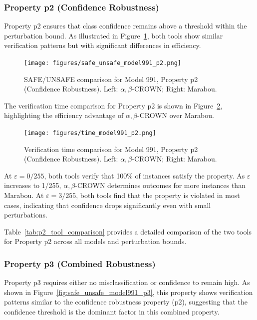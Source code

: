 

\subsubsection{Property p2 (Confidence Robustness)}

Property p2 ensures that class confidence remains above a threshold within the perturbation bound. As illustrated in Figure~\ref{fig:safe_unsafe_model991_p2}, both tools show similar verification patterns but with significant differences in efficiency.

\begin{figure}[htbp]
    \centering
    \texttt{[image: figures/safe\_unsafe\_model991\_p2.png]}
    \caption{SAFE/UNSAFE comparison for Model 991, Property p2 (Confidence Robustness). Left: $\alpha, \beta$-CROWN; Right: Marabou.}
    \label{fig:safe_unsafe_model991_p2}
\end{figure}

The verification time comparison for Property p2 is shown in Figure~\ref{fig:time_model991_p2}, highlighting the efficiency advantage of $\alpha, \beta$-CROWN over Marabou.

\begin{figure}[htbp]
    \centering
    \texttt{[image: figures/time\_model991\_p2.png]}
    \caption{Verification time comparison for Model 991, Property p2 (Confidence Robustness). Left: $\alpha, \beta$-CROWN; Right: Marabou.}
    \label{fig:time_model991_p2}
\end{figure}

At $\varepsilon = 0/255$, both tools verify that 100\% of instances satisfy the property. As $\varepsilon$ increases to 1/255, $\alpha, \beta$-CROWN determines outcomes for more instances than Marabou. At $\varepsilon = 3/255$, both tools find that the property is violated in most cases, indicating that confidence drops significantly even with small perturbations.

Table~\ref{tab:p2_tool_comparison} provides a detailed comparison of the two tools for Property p2 across all models and perturbation bounds.



\subsubsection{Property p3 (Combined Robustness)}

Property p3 requires either no misclassification or confidence to remain high. As shown in Figure~\ref{fig:safe_unsafe_model991_p3}, this property shows verification patterns similar to the confidence robustness property (p2), suggesting that the confidence threshold is the dominant factor in this combined property.

